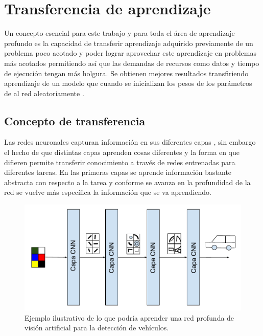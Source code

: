 
\chapter{Transferencia de aprendizaje} %

\label{Chapter3} %

Un concepto esencial para este trabajo y para toda el área de aprendizaje profundo es la capacidad de transferir aprendizaje adquirido previamente de un problema poco acotado y poder lograr aprovechar este aprendizaje en problemas más acotados permitiendo así que las demandas de recursos como datos y tiempo de ejecución tengan más holgura. Se obtienen mejores resultados transfiriendo aprendizaje de un modelo que cuando se inicializan los pesos de los parámetros de al red aleatoriamente \parencite{Erhan:2010:WUP}.

\section{Concepto de transferencia}

Las redes neuronales capturan información en sus diferentes capas \parencite{yosinski:2014}, sin embargo el hecho de que distintas capas aprenden cosas diferentes y la forma en que difieren permite transferir conocimiento a través de redes entrenadas para diferentes tareas. En las primeras capas se aprende información bastante abstracta con respecto a la tarea y conforme se avanza en la profundidad de la red se vuelve más específica la información que se va aprendiendo.

\begin{figure}
\includegraphics[scale=1]{Figures/learnbylayer.pdf}
\caption{Ejemplo ilustrativo de lo que podría aprender una red profunda de visión artificial para la detección de vehículos.}
\label{fig:learnbylayer}
\end{figure}

